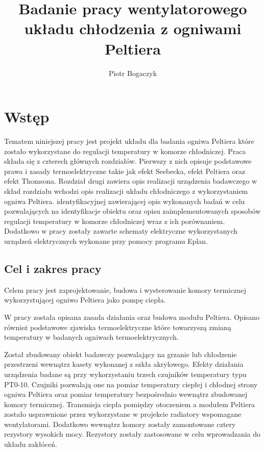 \documentclass[oneside]{mgr}
\title{Badanie pracy wentylatorowego układu chłodzenia z ogniwami Peltiera}
\author{Piotr Bogaczyk}
\begin{document}
\maketitle
\tableofcontents

\chapter{Wstęp}
Tematem niniejszej pracy jest projekt układu dla badania ogniwa Peltiera które zostało wykorzystane do regulacji temperatury w komorze chłodniczej. Praca składa się z czterech głównych rozdziałów. Pierwszy z nich opisuje podstawowe prawa i zasady termoelektryczne takie jak efekt Seebecka, efekt Peltiera oraz efekt Thomsona. Rozdział drugi zawiera opis realizacji urządzenia badawczego w skład rozdziału wchodzi opis realizacji układu chłodniczego z wykorzystaniem ogniwa Peltiera. identyfikacyjnej zawierającej opis wykonanych badań w celu pozwalających na identyfikacje obiektu oraz opisu zaimplementowanych sposobów regulacji temperatury w komorze chłodniczej wraz z ich porównaniem. Dodatkowo w pracy zostały zawarte schematy elektryczne wykorzystanych urządzeń elektrycznych wykonane przy pomocy programu Eplan.

\section{Cel i zakres pracy}

Celem pracy jest zaprojektowanie, budowa i wysterowanie komory termicznej wykorzystującej ogniwo Peltiera jako pompę ciepła.

W pracy została opisana zasada działania oraz budowa modułu Peltiera. Opisano również podstawowe zjawiska termoelektryczne które towarzyszą zmianą temperatury w badanych ogniwach termoelektrycznych.

Został zbudowany obiekt badawczy pozwalający na grzanie lub chłodzenie przestrzeni wewnątrz kasety wykonanej z szkła akrylowego. Efekty działania urządzenia badane są przy wykorzystaniu trzech czujników temperatury typu PT0-10. Czujniki pozwalają one na pomiar temperatury ciepłej i chłodnej strony ogniwa Peltiera oraz pomiar temperatury bezpośrednio wewnątrz zbudowanej komory termicznej. Transmisja ciepła pomiędzy otoczeniem a modułem Peltiera zostało usprawnione przez wykorzystane w projekcie radiatory wspomagane wentylatorami. Dodatkowo wewnątrz komory zostały zamontowane cztery rezystory wysokich mocy. Rezystory zostały zastosowane w celu wprowadzania do układu zakłóceń.
\end{document}
